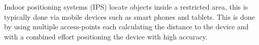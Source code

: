 Indoor positioning systems (IPS) locate objects inside a restricted area, this is typically done via mobile devices such as smart phones and tablets. This is done by using multiple access-points each calculating the distance to the device and with a combined effort positioning the device with high accuracy\cite{WhatIsIPS}. 